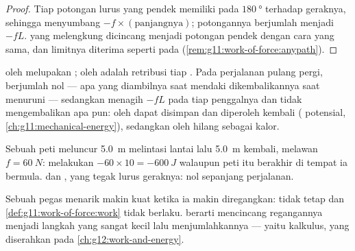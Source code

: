 \begin{proof}
Tiap potongan lurus yang pendek memiliki  pada
$\qty{180}{\degree}$ terhadap geraknya, sehingga menyumbang
$-f \times (\text{panjangnya})$; potongannya berjumlah menjadi $-fL$.
 yang melengkung dicincang menjadi potongan pendek dengan cara
yang sama, dan limitnya diterima seperti pada 
(\cref{rem:g11:work-of-force:anypath}).
\end{proof}

\begin{remark}\label{rem:g11:work-of-force:divide}
 oleh  melupakan ;  oleh  adalah
retribusi tiap . Pada perjalanan pulang pergi,  berjumlah
nol --- apa yang diambilnya saat mendaki dikembalikannya saat menuruni
--- sedangkan  menagih $-fL$ pada tiap penggalnya dan tidak
mengembalikan apa pun:  oleh  dapat disimpan dan diperoleh
kembali ( potensial, \cref{ch:g11:mechanical-energy}), sedangkan
 oleh  hilang sebagai kalor.
\end{remark}

\begin{example}\label{ex:g11:work-of-force:roundtrip}
Sebuah peti meluncur \qty{5.0}{m} melintasi lantai lalu \qty{5.0}{m}
kembali, melawan $f = \qty{60}{N}$:  melakukan
$-60 \times 10 =
\qty{-600}{J}$ walaupun peti itu berakhir di tempat ia
bermula.  dan , yang tegak lurus geraknya: nol
sepanjang perjalanan.
\end{example}

\begin{remark}\label{rem:g11:work-of-force:spring}
Sebuah pegas menarik makin kuat ketika ia makin diregangkan: 
tidak tetap dan \cref{def:g11:work-of-force:work} tidak berlaku.
 berarti mencincang regangannya menjadi langkah yang sangat
kecil lalu menjumlahkannya --- yaitu kalkulus, yang diserahkan pada
\cref{ch:g12:work-and-energy}.
\end{remark}

